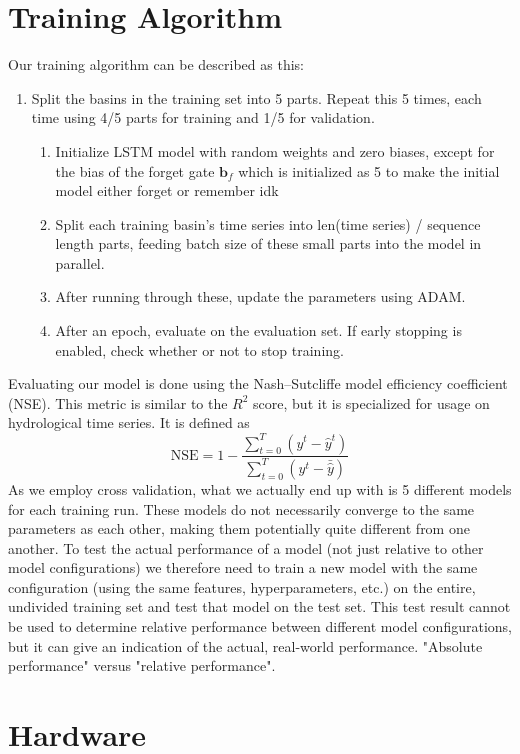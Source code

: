 \section{Training Algorithm}
Our training algorithm can be described as this:
\begin{enumerate}
    \item Split the basins in the training set into 5 parts. Repeat this 5 times, each time using 4/5 parts for training and 1/5 for validation.\begin{enumerate}
        \item Initialize LSTM model with random weights and zero biases, except for the bias of the forget gate $\bm{b}_f$ which is initialized as 5 to make the initial model either forget or remember idk \citationneeded
        \item Split each training basin's time series into len(time series) / sequence length parts, feeding batch size of these small parts into the model in parallel. 
        \item After running through these, update the parameters using ADAM.
        \item After an epoch, evaluate on the evaluation set. If early stopping is enabled, check whether or not to stop training.
    \end{enumerate}
\end{enumerate}
Evaluating our model is done using the Nash–Sutcliffe model efficiency coefficient (NSE). \cite{NSE}
This metric is similar to the $R^2$ score, but it is specialized for usage 
on hydrological time series.
It is defined as 
\begin{equation}
    \text{NSE} = 1 - \frac{\sum_{t=0}^T\left( y^t - \hat{y}^t\right)}{\sum_{t=0}^T\left(y^t - \bar{\hat{y}}\right)} \label{NSE}
\end{equation}
As we employ cross validation, what we actually end up with is 5 different models 
for each training run. These models do not necessarily converge to the same parameters 
as each other, making them potentially quite different from one another. To test the 
actual performance of a model (not just relative to other model configurations) we 
therefore need to train a new model with the same configuration (using the same features, 
hyperparameters, etc.) on the entire, undivided training set and test that model 
on the test set. This test result cannot be used to determine relative performance 
between different model configurations, but it can give an indication of the actual, 
real-world performance. "Absolute performance" versus "relative performance".

\section{Hardware}
